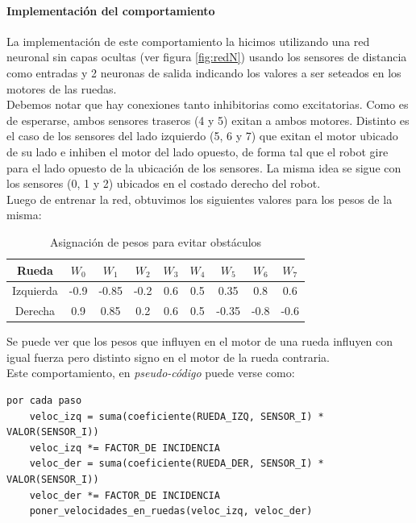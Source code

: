 \paragraph{Implementaci\'on del comportamiento}
La implementaci\'on de este comportamiento la hicimos utilizando una
red neuronal sin capas ocultas (ver figura \ref{fig:redN}) usando los sensores
de distancia como entradas y 2 neuronas de salida indicando los valores a
ser seteados en los motores de las ruedas.
\\
Debemos notar que hay conexiones tanto inhibitorias como excitatorias. Como es
de esperarse, ambos sensores traseros (4 y 5) exitan a ambos motores. Distinto
es el caso de los sensores del lado izquierdo (5, 6 y 7) que exitan el motor
ubicado de su lado e inhiben el motor del lado opuesto, de forma tal que el
robot gire para el lado opuesto de la ubicaci\'on de los sensores. La misma
idea se sigue con los sensores (0, 1 y 2) ubicados en el costado derecho del
robot.
\\
Luego de entrenar la red, obtuvimos los siguientes valores para los pesos de la
misma:

\begin{table}[ht]
	\begin{center}
		\begin{tabular}{ | c | c | c | c | c | c | c | c | c | }
			\hline 
			Rueda & $W_0$ & $W_1$ & $W_2$ & $W_3$ &  $W_4$ & $W_5$ & $W_6$ & $W_7$ \\
			\hline\hline
			Izquierda & -0.9 & -0.85 & -0.2 & 0.6 & 0.5 & 0.35 & 0.8 & 0.6 \\
			\hline
			Derecha & 0.9 & 0.85 & 0.2 & 0.6 & 0.5 & -0.35 & -0.8 & -0.6 \\
			\hline
		\end{tabular}
	\end{center}
	\label{pesos_obstaculo} 
	\caption{Asignaci\'on de pesos para evitar obst\'aculos}
\end{table}
Se puede ver que los pesos que influyen en el motor de una rueda influyen
con igual fuerza pero distinto signo en el motor de la rueda contraria.
\\
Este comportamiento, en \emph{pseudo-c\'odigo} puede verse como:
\begin{verbatim}
por cada paso
    veloc_izq = suma(coeficiente(RUEDA_IZQ, SENSOR_I) * VALOR(SENSOR_I))
    veloc_izq *= FACTOR_DE INCIDENCIA
    veloc_der = suma(coeficiente(RUEDA_DER, SENSOR_I) * VALOR(SENSOR_I))
    veloc_der *= FACTOR_DE INCIDENCIA
    poner_velocidades_en_ruedas(veloc_izq, veloc_der)
\end{verbatim}

